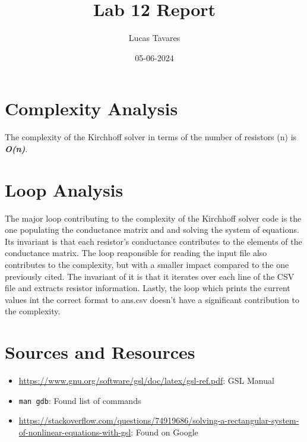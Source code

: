 \documentclass{article}
\title{Lab 12 Report}
\date{05-06-2024}
\author{Lucas Tavares}
\begin{document}
\maketitle


\newpage

\section{Complexity Analysis}

The complexity of the Kirchhoff solver in terms of the number of resistors (n) is \textbf{\textit{O(n)}}.


\section{Loop Analysis}

The major loop contributing to the complexity of the Kirchhoff solver code is the one populating the conductance matrix and and solving the system of equations. Its invariant is that each resistor's conductance contributes to the elements of the conductance matrix. The loop reaponsible for reading the input file also contributes to the complexity, but with a smaller impact compared to the one previously cited. The invariant of it is that it iterates over each line of the CSV file and extracts resistor information. Lastly, the loop which prints the current values int the correct format to ans.csv doesn't have a significant contribution to the complexity.


\newpage

\section{Sources and Resources}

\begin{flushleft}
  \begin{itemize}
  \item{\url{https://www.gnu.org/software/gsl/doc/latex/gsl-ref.pdf}: GSL Manual}
  \item{\texttt{man gdb}: Found list of commands}
  \item{\url{https://stackoverflow.com/questions/74919686/solving-a-rectangular-system-of-nonlinear-equations-with-gsl}: Found on Google}
  \end{itemize}
\end{flushleft}
\end{document}
